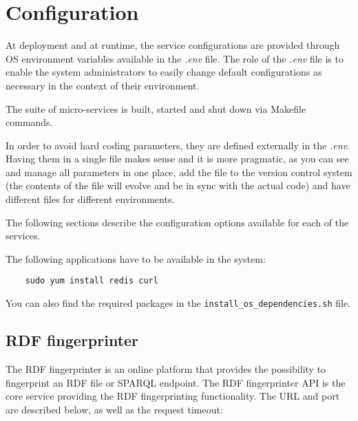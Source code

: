 \section{Configuration}
\label{sec:configuration}
At deployment and at runtime, the service configurations are provided through OS environment variables available in the \textit{.env} file. The role of the \textit{.env} file is to enable the system administrators to easily change default configurations as necessary in the context of their environment.

The suite of micro-services is built, started and shut down via Makefile commands.

In order to avoid hard coding parameters, they are defined externally in the \textit{.env}. Having them in a single file makes  sense and it is more pragmatic, as you can see and manage all parameters in one place, add the file to the version control system (the contents of the file will evolve and be in sync with the actual code) and have different files for different environments.

The following sections describe the configuration options available for each of the services.

The following applications have to be available in the system:
\begin{lstlisting}
	sudo yum install redis curl
\end{lstlisting}
You can also find the required packages in the \texttt{install\_os\_dependencies.sh} file.

\subsection{RDF fingerprinter}

The RDF fingerprinter is an online platform that provides the possibility to fingerprint an RDF file or SPARQL endpoint. The RDF fingerprinter API is the core service providing the RDF fingerprinting functionality. The URL and port are described below, as well as the request timeout:


